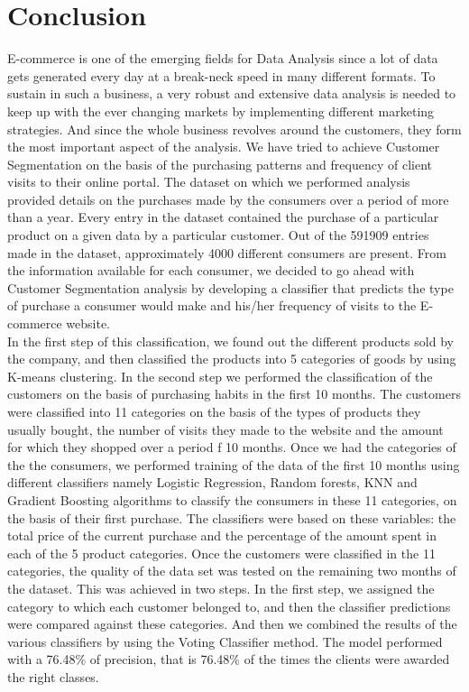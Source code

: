 \section{Conclusion}
E-commerce is one of the emerging fields for Data Analysis since a lot of data gets generated every day at a break-neck speed in many different formats. To sustain in such a business, a very robust and extensive data analysis is needed to keep up with the ever changing markets by implementing different marketing strategies. And since the whole business revolves around the customers, they form the most important aspect of the analysis. We have tried to achieve Customer Segmentation on the basis of the purchasing patterns and frequency of client visits to their online portal. The dataset on which we performed analysis provided details on the purchases made by the consumers over a period of more than a year. Every entry in the dataset contained the purchase of a particular product on a given data by a particular customer. Out of the 591909 entries made in the dataset, approximately 4000 different consumers are present. From the information available for each consumer, we decided to go ahead with Customer Segmentation analysis by developing a classifier that predicts the type of purchase a consumer would make and his/her frequency of visits to the E-commerce website. \\
In the first step of this classification, we found out the different products sold by the company, and then classified the products into 5 categories of goods by using K-means clustering. In the second step we performed the classification of the customers on the basis of purchasing habits in the first 10 months. The customers were classified into 11 categories on the basis of the types of products they usually bought, the number of visits they made to the website and the amount for which they shopped over a period f 10 months. Once we had the categories of the the consumers, we performed training of the data of the first 10 months using different classifiers namely Logistic Regression, Random forests, KNN and Gradient Boosting algorithms to classify the consumers in these 11 categories, on the basis of their first purchase. The classifiers were based on these variables: the total price of the current purchase and the percentage of the amount spent in each of the 5 product categories. Once the customers were classified in the 11 categories, the quality of the data set was tested on the remaining two months of the dataset. This was achieved in two steps. In the first step, we assigned the category to which each customer belonged to, and then the classifier predictions were compared against these categories. And then we combined the results of the various classifiers by using the Voting Classifier method. The model performed with a 76.48\% of precision, that is 76.48\% of the times the clients were awarded the right classes.\\
